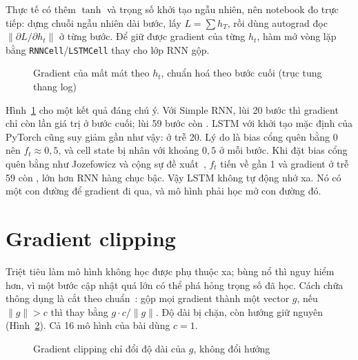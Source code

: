 Thực tế có thêm $\tanh$ và trọng số khởi tạo ngẫu nhiên, nên notebook đo trực tiếp: dựng chuỗi ngẫu nhiên dài
 bước, lấy $L = \sum h_T$, rồi dùng autograd đọc $\lVert\partial L/\partial h_t\rVert$ ở từng bước.
Để giữ được gradient của từng $h_t$, hàm mở vòng lặp bằng \texttt{RNNCell}/\texttt{LSTMCell} thay cho lớp RNN gộp.


\begin{figure}[H]
  \centering
  \caption{Gradient của mất mát theo $h_t$, chuẩn hoá theo bước cuối (trục tung thang log)}
  \label{fig:gradnorm}
\end{figure}

Hình~\ref{fig:gradnorm} cho một kết quả đáng chú ý. Với Simple RNN, lùi 20 bước thì gradient chỉ còn
 lần giá trị ở bước cuối; lùi 59 bước còn . LSTM với khởi tạo
mặc định của PyTorch cũng suy giảm gần như vậy:  ở trễ 20. Lý do là bias cổng quên bằng 0
nên $f_t \approx 0{,}5$, và cell state bị nhân với khoảng $0{,}5$ ở mỗi bước. Khi đặt bias cổng quên bằng
 như Jozefowicz và cộng sự đề xuất~\cite{jozefowicz2015}, $f_t$ tiến về gần 1 và gradient ở trễ
59 còn , lớn hơn RNN hàng chục bậc. Vậy LSTM không tự động nhớ xa. Nó có một con đường để
gradient đi qua, và mô hình phải học mở con đường đó.

\section{Gradient clipping}

Triệt tiêu làm mô hình không học được phụ thuộc xa; bùng nổ thì nguy hiểm hơn, vì một bước cập nhật quá lớn có thể phá
hỏng trọng số đã học. Cách chữa thông dụng là cắt theo chuẩn~\cite{pascanu2013}: gộp mọi gradient thành một vector
$g$, nếu $\lVert g\rVert > c$ thì thay bằng $g \cdot c / \lVert g\rVert$. Độ dài bị chặn, còn hướng giữ nguyên
(Hình~\ref{fig:clip}). Cả 16 mô hình của bài dùng $c = 1$.


\begin{figure}[H]
  \centering
  \caption{Gradient clipping chỉ đổi độ dài của $g$, không đổi hướng}
  \label{fig:clip}
\end{figure}

